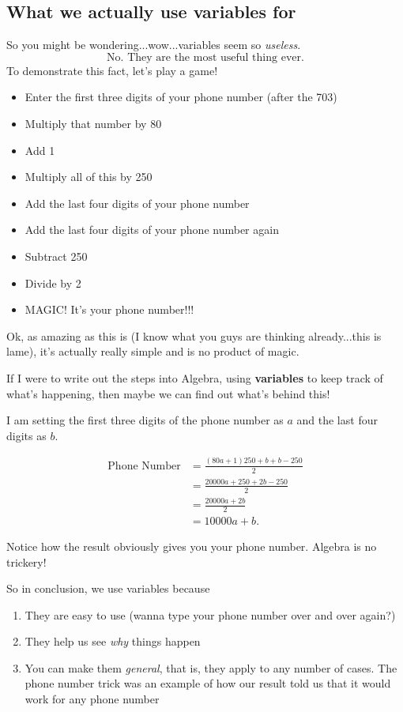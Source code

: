 \subsection{What we actually use variables for}
So you might be wondering...wow...variables seem so \textit{useless}.
$$\text{No. They are the most useful thing ever.}$$
To demonstrate this fact, let's play a game!

\begin{itemize}
\item Enter the first three digits of your phone number (after the 703)
\item Multiply that number by 80
\item Add 1
\item Multiply all of this by 250
\item Add the last four digits of your phone number 
\item Add the last four digits of your phone number again
\item Subtract 250
\item Divide by 2
\item MAGIC! It's your phone number!!!
\end{itemize}

Ok, as amazing as this is (I know what you guys are thinking already...this is lame), it's actually really simple and is no product of magic.

If I were to write out the steps into Algebra, using \textbf{variables} to keep track of what's happening, then maybe we can find out what's behind this! 

I am setting the first three digits of the phone number as $a$ and the last four digits as $b$.

\begin{align*}
\text{Phone Number} &= \frac{(80a+1)250 + b+b-250}{2} \\
&= \frac{20000a+250 + 2b-250}{2} \\
&= \frac{20000a+ 2b}{2} \\
&= \boxed{10000a+b}.
\end{align*}

Notice how the result obviously gives you your phone number. Algebra is no trickery! 

So in conclusion, we use variables because

\begin{enumerate}
\item They are easy to use (wanna type your phone number over and over again?)
\item They help us see \textit{why} things happen
\item You can make them \textit{general}, that is, they apply to any number of cases. The phone number trick was an example of how our result told us that it would work for any phone number
\end{enumerate}

